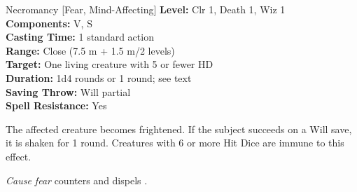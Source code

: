 {Necromancy [Fear, Mind-Affecting]}
{
	\textbf{Level:}
	Clr 1, Death 1, Wiz 1\\
	\textbf{Components:}
	V, S\\
	\textbf{Casting Time:}
	1 standard action\\
	\textbf{Range:}
	Close (7.5 m + 1.5 m/2 levels)\\
	\textbf{Target:}
	One living creature with 5 or fewer HD\\
	\textbf{Duration:}
	1d4 rounds or 1 round; see text\\
	\textbf{Saving Throw:}
	Will partial\\
	\textbf{Spell Resistance:}
	Yes\\
}
{
	The affected creature becomes frightened. If the subject succeeds on a Will save, it is shaken for 1 round. Creatures with 6 or more Hit Dice are immune to this effect.

	\emph{Cause fear} counters and dispels .

}
